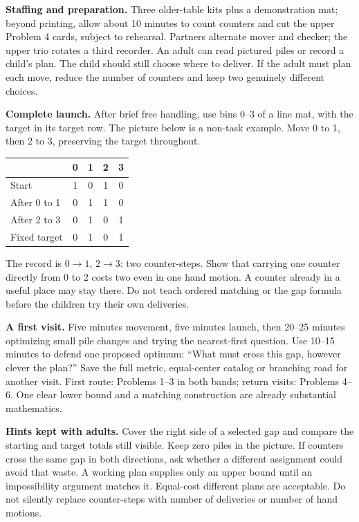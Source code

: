 \documentclass[11pt]{article}
\begin{document}
\textbf{Staffing and preparation.} Three older-table kits plus a demonstration mat; beyond printing, allow about 10 minutes to count counters and cut the upper Problem 4 cards, subject to rehearsal. Partners alternate mover and checker; the upper trio rotates a third recorder. An adult can read pictured piles or record a child's plan. The child should still choose where to deliver. If the adult must plan each move, reduce the number of counters and keep two genuinely different choices.

\textbf{Complete launch.} After brief free handling, use bins 0--3 of a line mat, with the target in its target row. The picture below is a non-task example. Move 0 to 1, then 2 to 3, preserving the target throughout.
\begin{center}\renewcommand{\arraystretch}{1.25}
\begin{tabular}{lcccc}
 & 0&1&2&3\\\midrule
Start&1&0&1&0\\
After 0 to 1&0&1&1&0\\
After 2 to 3&0&1&0&1\\\midrule
Fixed target&0&1&0&1
\end{tabular}
\end{center}
The record is $0\to1$, $2\to3$: two counter-steps. Show that carrying one counter directly from 0 to 2 costs two even in one hand motion. A counter already in a useful place may stay there. Do not teach ordered matching or the gap formula before the children try their own deliveries.

\textbf{A first visit.} Five minutes movement, five minutes launch, then 20--25 minutes optimizing small pile changes and trying the nearest-first question. Use 10--15 minutes to defend one proposed optimum: ``What must cross this gap, however clever the plan?'' Save the full metric, equal-center catalog or branching road for another visit. First route: Problems 1--3 in both bands; return visits: Problems 4--6. One clear lower bound and a matching construction are already substantial mathematics.

\textbf{Hints kept with adults.} Cover the right side of a selected gap and compare the starting and target totals still visible. Keep zero piles in the picture. If counters cross the same gap in both directions, ask whether a different assignment could avoid that waste. A working plan supplies only an upper bound until an impossibility argument matches it. Equal-cost different plans are acceptable. Do not silently replace counter-steps with number of deliveries or number of hand motions.


\end{document}
